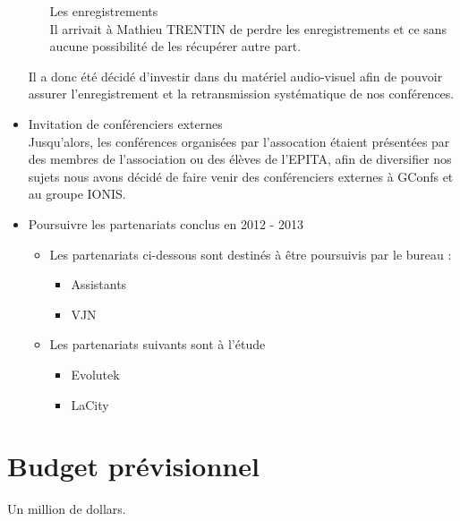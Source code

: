 \documentclass[12pt]{report}
\begin{document}
\begin{itemize}
\begin{itemize}
          Les enregistrements \\ Il arrivait à Mathieu TRENTIN de perdre les
          enregistrements et ce sans aucune possibilité de les récupérer autre
          part.
      \end{itemize}
      Il a donc été décidé d'investir dans du matériel audio-visuel afin de
      pouvoir assurer l'enregistrement et la retransmission systématique de nos
      conférences.
    \item
      Invitation de conférenciers externes\\ Jusqu'alors, les conférences
      organisées par l'assocation étaient présentées par des membres de
      l'association ou des élèves de l'EPITA, afin de diversifier nos sujets
      nous avons décidé de faire venir des conférenciers externes à GConfs et au
      groupe IONIS.
    \item Poursuivre les partenariats conclus en 2012 - 2013
      \begin{itemize}
        \item Les partenariats ci-dessous sont destinés à être poursuivis par le bureau :
        \begin{itemize}
          \item Assistants
          \item VJN
        \end{itemize}
      \item Les partenariats suivants sont à l'étude
        \begin{itemize}
          \item Evolutek
          \item LaCity
        \end{itemize}
      \end{itemize}
  \end{itemize}
  \section{Budget prévisionnel}
  Un million de dollars.
\end{document}
